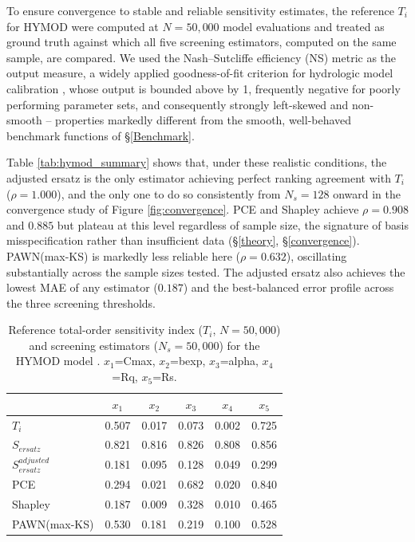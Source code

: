\documentclass[12pt]{article}
\begin{document}
To ensure convergence to stable and reliable sensitivity estimates, the reference $T_i$ for HYMOD were computed at $N=50{,}000$ model evaluations and treated as ground truth against which all five screening estimators, computed on the same sample, are compared. We used the Nash--Sutcliffe efficiency (NS) metric \citep{nash1970river} as the output measure, a widely applied goodness-of-fit criterion for hydrologic model calibration \citep{sheikholeslami2020fresh}, whose output is bounded above by 1, frequently negative for poorly performing parameter sets, and consequently strongly left-skewed and non-smooth -- properties markedly different from the smooth, well-behaved benchmark functions of \S\ref{Benchmark}.

Table \ref{tab:hymod_summary} shows that, under these realistic conditions, the adjusted ersatz is the only estimator achieving perfect ranking agreement with $T_i$ ($\rho=1.000$), and the only one to do so consistently from $N_s=128$ onward in the convergence study of Figure \ref{fig:convergence}. PCE and Shapley achieve $\rho=0.908$ and $0.885$ but plateau at this level regardless of sample size, the signature of basis misspecification rather than insufficient data (\S\ref{theory}, \S\ref{convergence}). PAWN(max-KS) is markedly less reliable here ($\rho=0.632$), oscillating substantially across the sample sizes tested. The adjusted ersatz also achieves the lowest MAE of any estimator ($0.187$) and the best-balanced error profile across the three screening thresholds.

\begin{table}[H]
\centering
\begin{tabular}{@{}lccccc@{}} \toprule
 & $x_1$ & $x_2$ & $x_3$ & $x_4$ & $x_5$ \\ \midrule
$T_i$                   & 0.507 & 0.017 & 0.073 & 0.002 & 0.725 \\
$S_{ersatz}$            & 0.821 & 0.816 & 0.826 & 0.808 & 0.856 \\
$S^{adjusted}_{ersatz}$ & 0.181 & 0.095 & 0.128 & 0.049 & 0.299 \\
PCE                     & 0.294 & 0.021 & 0.682 & 0.020 & 0.840 \\
Shapley                 & 0.187 & 0.009 & 0.328 & 0.010 & 0.465 \\
PAWN(max-KS)            & 0.530 & 0.181 & 0.219 & 0.100 & 0.528 \\ \bottomrule
\end{tabular}
\caption{Reference total-order sensitivity index ($T_i$, $N=50{,}000$) and screening estimators ($N_s=50{,}000$) for the HYMOD model \citep{vrugt2003shuffled}. $x_1$=Cmax, $x_2$=bexp, $x_3$=alpha, $x_4$=Rq, $x_5$=Rs.}
\label{tab:hymod_function}
\end{table}
\end{document}
